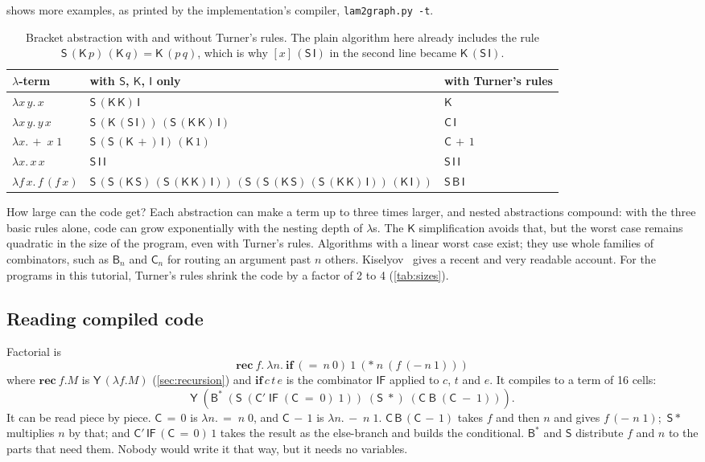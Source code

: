\documentclass[11pt,a4paper]{article}
\newcommand{\cmb}[1]{\textsf{#1}}
\newcommand{\I}{\cmb{I}}
\newcommand{\K}{\cmb{K}}
\newcommand{\Sc}{\cmb{S}}
\newcommand{\B}{\cmb{B}}
\newcommand{\C}{\cmb{C}}
\newcommand{\Bs}{\cmb{B}^{*}}
\newcommand{\Cp}{\cmb{C}'}
\newcommand{\Y}{\cmb{Y}}
\newcommand{\IF}{\cmb{IF}}
\newcommand{\abs}[2]{[#1]\,#2}
\theoremstyle{definition}
\theoremstyle{plain}
\begin{document}
 shows more examples, as printed by the implementation's
compiler, \texttt{lam2graph.py -t}.

\begin{table}[t]
\centering
\small
\begin{tabular}{@{}l l l@{}}
\toprule
$\lambda$-term & with $\Sc$, $\K$, $\I$ only & with Turner's rules\\
\midrule
$\lambda x\,y.\,x$ & $\Sc\,(\K\,\K)\,\I$ & $\K$\\
$\lambda x\,y.\,y\,x$ & $\Sc\,(\K\,(\Sc\,\I))\,(\Sc\,(\K\,\K)\,\I)$ & $\C\,\I$\\
$\lambda x.\,{+}\;x\;1$ & $\Sc\,(\Sc\,(\K\,{+})\,\I)\,(\K\,1)$ & $\C\,{+}\,1$\\
$\lambda x.\,x\,x$ & $\Sc\,\I\,\I$ & $\Sc\,\I\,\I$\\
$\lambda f\,x.\,f\,(f\,x)$ & $\Sc\,(\Sc\,(\K\,\Sc)\,(\Sc\,(\K\,\K)\,\I))\,(\Sc\,(\Sc\,(\K\,\Sc)\,(\Sc\,(\K\,\K)\,\I))\,(\K\,\I))$ & $\Sc\,\B\,\I$\\
\bottomrule
\end{tabular}
\caption{Bracket abstraction with and without Turner's rules. The plain
algorithm here already includes the rule
$\Sc\,(\K\,p)\,(\K\,q) = \K\,(p\,q)$, which is why $\abs{x}{(\Sc\,\I)}$ in the
second line became $\K\,(\Sc\,\I)$.}
\label{tab:abs}
\end{table}

\begin{aside}{How large can the code get?}
Each abstraction can make a term up to three times larger, and nested
abstractions compound: with the three basic rules alone, code can grow
exponentially with the nesting depth of $\lambda$s. The $\K$ simplification
avoids that, but the worst case remains quadratic in the size of the
program, even with Turner's rules. Algorithms with a linear worst case exist;
they use whole families of combinators, such as $\B_n$ and $\C_n$ for
routing an argument past $n$ others. Kiselyov~\cite{kiselyov18} gives a
recent and very readable account. For the programs in this tutorial, Turner's
rules shrink the code by a factor of 2 to 4 (\cref{tab:sizes}).
\end{aside}

\subsection{Reading compiled code}

Factorial is
\[
  \mathbf{rec}\ f.\ \lambda n.\ \mathbf{if}\ ({=}\ n\ 0)\ 1\ ({*}\ n\ (f\ ({-}\ n\ 1)))
\]
where $\mathbf{rec}\ f.M$ is $\Y\,(\lambda f.M)$ (\cref{sec:recursion}) and
$\mathbf{if}\,c\,t\,e$ is the combinator $\IF$ applied to $c$, $t$ and $e$.
It compiles to a term of 16 cells:
\[
  \Y\;(\Bs\;(\Sc\;(\Cp\;\IF\;(\C\;{=}\;0)\;1))\;(\Sc\;{*})\;(\C\;\B\;(\C\;{-}\;1))).
\]
It can be read piece by piece. $\C\,{=}\,0$ is $\lambda n.\,{=}\;n\;0$, and
$\C\,{-}\,1$ is $\lambda n.\,{-}\;n\;1$. $\C\,\B\,(\C\,{-}\,1)$ takes $f$ and then
$n$ and gives $f\,({-}\;n\;1)$; $\Sc\,{*}$ multiplies $n$ by that; and
$\Cp\,\IF\,(\C\,{=}\,0)\,1$ takes the result as the else-branch and builds the
conditional. $\Bs$ and $\Sc$ distribute $f$ and $n$ to the parts that need
them. Nobody would write it that way, but it needs no variables.
\end{document}
